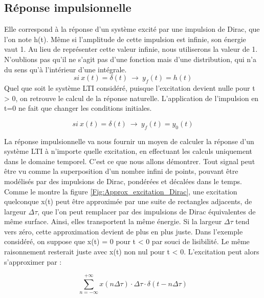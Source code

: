 	\subsection{Réponse impulsionnelle}
	Elle correspond à la réponse d'un système excité par une impulsion de Dirac, que l'on note h(t). Même si l'amplitude de cette impulsion est infinie, son énergie vaut 1. Au lieu de représenter cette valeur infinie, nous utiliserons la valeur de 1. N'oublions pas qu'il ne s'agit pas d'une fonction mais d'une distribution, qui n'a du sens qu'à l'intérieur d'une intégrale.
	\begin{equation}\label{key}
	si~x(t)=\delta (t)~\rightarrow ~y_{f}(t)=h(t)
	\end{equation}
	Quel que soit le système LTI considéré, puisque l'excitation devient nulle pour t > 0, on retrouve le calcul de la réponse naturelle. L'application de l'impulsion en t=0 ne fait que changer les conditions initiales.
	
	\begin{equation}\label{}
	si~x(t)=\delta (t)~\rightarrow ~y_{f}(t) = y_{0}(t)	 	
	\end{equation}
	
	
	
	\vspace{1\baselineskip}
	La réponse impulsionnelle va nous fournir un moyen de calculer la
	réponse d'un système LTI à n'importe quelle excitation, en effectuant
	les calculs uniquement dans le domaine temporel. C'est ce que nous
	allons démontrer. Tout signal peut être vu comme la superposition d'un nombre infini de points, pouvant être modélisés par des impulsions de Dirac, pondérées et décalées dans le temps. Comme le montre
	la figure \ref{Fig:Approx_excitation_Dirac}, une excitation quelconque x(t) peut être
	approximée par une suite de rectangles adjacents, de largeur $ \Delta \tau $, que
	l'on peut remplacer par des impulsions de Dirac équivalentes de même
	surface. Ainsi, elles transportent la même énergie. Si la largeur $ \Delta \tau $
	tend vers zéro, cette approximation devient de plus en plus juste. Dans
	l'exemple considéré, on suppose que x(t) = 0 pour t \textless{} 0 par
	souci de lisibilité. Le même raisonnement resterait juste avec x(t) non
	nul pour t \textless{} 0. L'excitation peut alors s'approximer par :
	
	
	\begin{equation*}\label{}
	\sum_{n=-\infty}^{+\infty}x(n\Delta \tau) \cdot	\Delta \tau \cdot \delta (t-n\Delta \tau)	
	\end{equation*}
	
